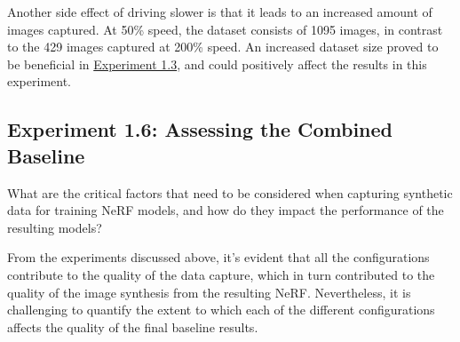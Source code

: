 Another side effect of driving slower is that it leads to an increased amount of images captured. At 50\% speed, the dataset consists of 1095 images, in contrast to the 429 images captured at 200\% speed. An increased dataset size proved to be beneficial in \hyperref[sec:exp-number-of-frames]{Experiment 1.3}, and could positively affect the results in this experiment.


























\subsection{Experiment 1.6: Assessing the Combined Baseline}
\begin{description}[leftmargin=!,labelwidth=\widthof{RQ 1:}]
\item[\textbf{RQ 1:}] What are the critical factors that need to be considered when capturing synthetic data for training NeRF models, and how do they impact the performance of the resulting models?
\end{description}


From the experiments discussed above, it's evident that all the configurations contribute to the quality of the data capture, which in turn contributed to the quality of the image synthesis from the resulting NeRF. Nevertheless, it is challenging to quantify the extent to which each of the different configurations affects the quality of the final baseline results.

